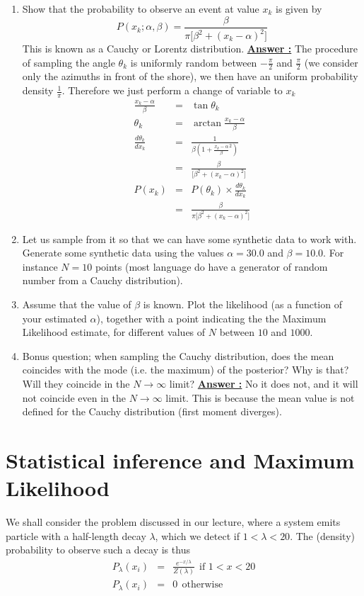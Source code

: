 \documentclass[11pt]{article}
\begin{document}
\begin{enumerate}
\item Show that the probability to observe an event at value $x_k$ is given by
$$
P(x_k ; \alpha,\beta) = \frac{\beta}{\pi \big[\beta^2 + (x_k - \alpha)^2 \big]}
$$
This  is known as a Cauchy or Lorentz distribution.
\newline
\textbf{\underline{Answer :}}
The procedure of sampling the angle $\theta_k$ is uniformly random between $-\frac{\pi}{2}$ and $\frac{\pi}{2}$ (we consider only the azimuths in front of the shore), we then have an uniform probability density $\frac{1}{\pi}$. Therefore we just perform a change of variable to $x_k$
\begin{eqnarray*}
	\frac{x_k - \alpha}{\beta} &= &\tan{\theta_k} \\
    \theta_k &= &\arctan{\frac{x_k - \alpha}{\beta}} \\
    \frac{d\theta_k}{dx_k} &= &\frac{1}{\beta(1 + \frac{x_k - \alpha}{\beta}^2)} \\
    &= &\frac{\beta}{ \big[\beta^2 + (x_k - \alpha)^2 \big]} \\
    P(x_k) &= &P(\theta_k) \times \frac{d\theta_k}{dx_k} \\
    &= &\frac{\beta}{\pi \big[\beta^2 + (x_k - \alpha)^2 \big]}
\end{eqnarray*}

\item Let us sample from it so that we can have some synthetic data to work with. Generate some synthetic data using the values $\alpha = 30.0$ and  $\beta = 10.0$. For instance $N=10$ points (most language do have a generator of random number from a Cauchy distribution).
\item Assume that the value of $\beta$ is known. Plot the likelihood (as a function of your estimated $\alpha$), together with a point indicating the 
the Maximum Likelihood estimate, for different values of $N$ between $10$ and $1000$.
\item Bonus question; when sampling the Cauchy distribution, does the mean coincides with the mode (i.e. the maximum) of the posterior? Why is that? Will they coincide in the $N \to \infty$ limit?
\newline
\textbf{\underline{Answer :}}
No it does not, and it will not coincide even in the $N \to \infty$ limit. This is because the mean value is not defined for the Cauchy distribution (first moment diverges).
\end{enumerate}
%

\section{Statistical inference and Maximum Likelihood}
%
We shall consider the problem discussed in our lecture, where a system emits particle with a half-length decay $\lambda$, which we detect if $1<\lambda<20$. The (density) probability to observe such a decay is thus
\begin{eqnarray}
P_{\lambda}(x_i) &=& \frac{e^{-x/\lambda}}{Z(\lambda)}~~\text{if $1<x<20$}\\
P_{\lambda}(x_i) &=& 0 ~~\text{otherwise} \nonumber
\end{eqnarray}
\end{document}
